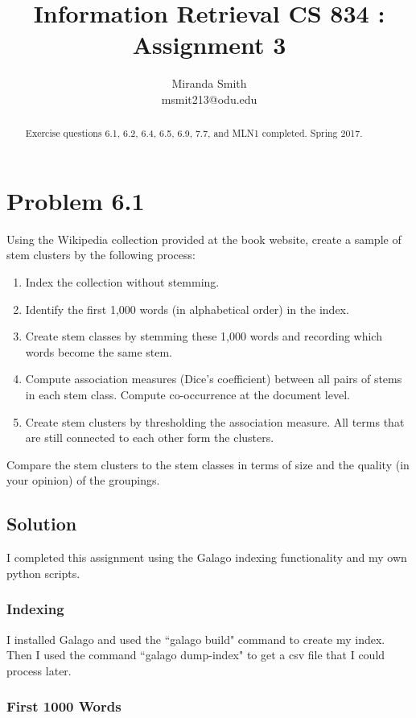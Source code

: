 \documentclass[letterpaper,12pt]{article}
\title{Information Retrieval CS 834 : Assignment 3}
\author{Miranda Smith\\ msmit213@odu.edu}
\begin{document}
\maketitle
\date{}

\begin{abstract}
Exercise questions 6.1, 6.2, 6.4, 6.5, 6.9, 7.7, and MLN1 completed. Spring 2017. 
\end{abstract}

\pagebreak

\section{Problem 6.1}
 Using the Wikipedia collection provided at the book website, create a sample of stem clusters by the following process:
\begin{enumerate}
  \item Index the collection without stemming.
  \item Identify the first 1,000 words (in alphabetical order) in the index.
  \item Create stem classes by stemming these 1,000 words and recording which words become the same stem.
  \item Compute association measures (Dice’s coefficient) between all pairs of stems in each stem class. Compute co-occurrence at the document level.
  \item Create stem clusters by thresholding the association measure. All terms that are still connected to each other form the clusters.
\end{enumerate}
Compare the stem clusters to the stem classes in terms of size and the quality (in your opinion) of the groupings.

\subsection{Solution}

I completed this assignment using the Galago indexing functionality and my own python scripts.

\subsubsection{Indexing}

I installed Galago and used the ``galago build" command to create my index. Then I used the command ``galago dump-index" to get a csv file that I could process later.

\subsubsection{First 1000 Words}
\end{document}
